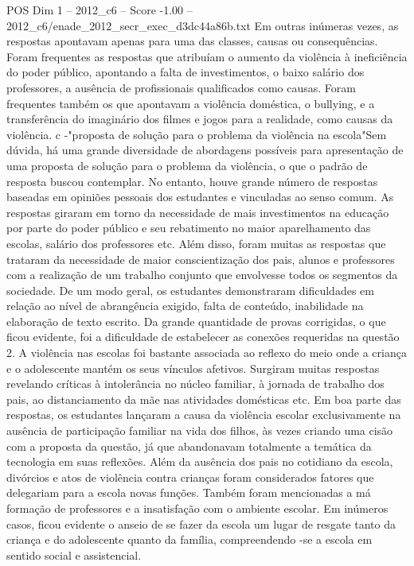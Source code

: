 \begin{textsample}{POS Dim 1 – 2012\_c6 – Score -1.00 – 2012\_c6/enade\_2012\_secr\_exec\_d3dc44a86b.txt}
Em outras inúmeras vezes, as respostas apontavam apenas para uma das classes, causas ou consequências.
Foram frequentes as respostas que atribuíam o aumento da violência à ineficiência do poder público, apontando a falta de investimentos, o baixo salário dos professores, a ausência de profissionais qualificados como causas.
Foram frequentes também os que apontavam a violência doméstica, o bullying, e a transferência do imaginário dos filmes e jogos para a realidade, como causas da violência. c -"proposta de solução para o problema da violência na escola"Sem dúvida, há uma grande diversidade de abordagens possíveis para apresentação de uma proposta de solução para o problema da violência, o que o padrão de resposta buscou contemplar.
No entanto, houve grande número de respostas baseadas em opiniões pessoais dos estudantes e vinculadas ao senso comum.
As respostas giraram em torno da necessidade de mais investimentos na educação por parte do poder público e seu rebatimento no maior aparelhamento das escolas, salário dos professores etc.
Além disso, foram muitas as respostas que trataram da necessidade de maior conscientização dos pais, alunos e professores com a realização de um trabalho conjunto que envolvesse todos os segmentos da sociedade.
De um modo geral, os estudantes demonstraram dificuldades em relação ao nível de abrangência exigido, falta de conteúdo, inabilidade na elaboração de texto escrito.
Da grande quantidade de provas corrigidas, o que ficou evidente, foi a dificuldade de estabelecer as conexões requeridas na questão 2.
A violência nas escolas foi bastante associada ao reflexo do meio onde a criança e o adolescente mantém os seus vínculos afetivos.
Surgiram muitas respostas revelando críticas à intolerância no núcleo familiar, à jornada de trabalho dos pais, ao distanciamento da mãe nas atividades domésticas etc.
Em boa parte das respostas, os estudantes lançaram a causa da violência escolar exclusivamente na ausência de participação familiar na vida dos filhos, às vezes criando uma cisão com a proposta da questão, já que abandonavam totalmente a temática da tecnologia em suas reflexões.
Além da ausência dos pais no cotidiano da escola, divórcios e atos de violência contra crianças foram considerados fatores que delegariam para a escola novas funções.
Também foram mencionadas a má formação de professores e a insatisfação com o ambiente escolar.
Em inúmeros casos, ficou evidente o anseio de se fazer da escola um lugar de resgate tanto da criança e do adolescente quanto da família, compreendendo -se a escola em sentido social e assistencial.

\end{textsample}
